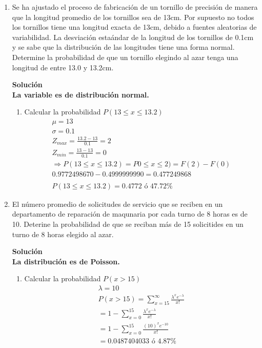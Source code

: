 \begin{enumerate}
    
    \item Se ha ajustado el proceso de fabricación de un tornillo de precisión de manera que la longitud promedio de los tornillos sea de 13cm. Por supuesto no todos los tornillos tiene una longitud exacta de 13cm, debido a fuentes aleatorias de variabilidad. La desviación estaándar de la longitud de los tornillos de 0.1cm y se sabe que la distribución de las longitudes tiene una forma normal. Determine la probabilidad de que un tornillo elegindo al azar tenga una longitud de entre 13.0 y 13.2cm.
    
    \textbf{Solución}\\
    \textbf{La variable es de distribución normal.}
    \begin{enumerate}
        
        \item Calcular la probabilidad $P(13\leq x\leq 13.2)$ \\
        \begin{gather*}
        \mu = 13\\
        \sigma = 0.1\\
        Z_{max} = \frac{13.2-13}{0.1} = 2\\
        Z_{min} = \frac{13-13}{0.1} = 0\\
        \Rightarrow P(13\leq x\leq 13.2)=P0\leq x\leq 2) = F(2) - F(0)\\
        0.9772498670-0.4999999990 = 0.477249868\\\\
        P(13\leq x\leq 13.2) =  0.4772 \text{ ó } 47.72\%
        \end{gather*}
    \end{enumerate}
    
    \item El número promedio de solicitudes de servicio que se reciben en un departamento de reparación de maqunaria por cada turno de 8 horas es de 10. Deterine la probabilidad de que se reciban más de 15 solicitides en un turno de 8 horas elegido al azar.
    
    \textbf{Solución}\\
    \textbf{La distribución es de Poisson.}
    \begin{enumerate}
        
        \item Calcular la probabilidad $P( x >15)$ \\
        \begin{gather*}
        \lambda = 10\\
        P( x >15) = \sum_{x=15}^{\infty}\frac{\lambda^{x}e^{-\lambda}}{x!}\\
        =1- \sum_{x=0}^{15}\frac{\lambda^{x}e^{-\lambda}}{x!}\\
        =1- \sum_{x=0}^{15}\frac{(10)^{x}e^{-10}}{x!}\\
        =0.0487404033 \text{ ó } 4.87\%
        \end{gather*}
    \end{enumerate}
    

\end{enumerate}
